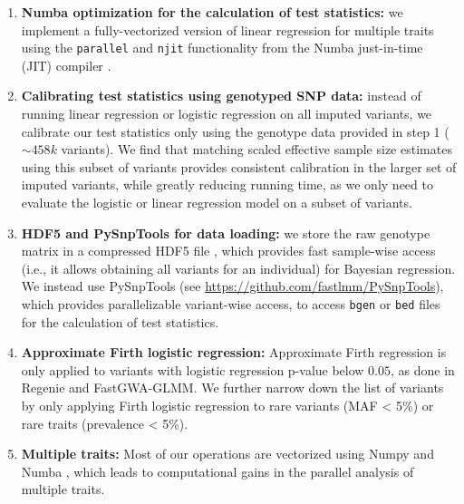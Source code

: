 \begin{enumerate}
    \item \textbf{Numba optimization for the calculation of test statistics:}
    we implement a fully-vectorized version of linear regression for multiple traits using the \texttt{parallel} and \texttt{njit} functionality from the Numba just-in-time (JIT) compiler \cite{lam2015numba}.
    \item \textbf{Calibrating test statistics using genotyped SNP data:}
    instead of running linear regression or logistic regression on all imputed variants, we calibrate our test statistics only using the genotype data provided in step 1 (${\sim}458k$ variants).
    We find that matching scaled effective sample size estimates using this subset of variants provides consistent calibration in the larger set of imputed variants, while greatly reducing running time, as we only need to evaluate the logistic or linear regression model on a subset of variants.
    \item \textbf{HDF5 and PySnpTools for data loading:}
    we store the raw genotype matrix in a compressed HDF5 file \cite{hdf5}, which provides fast sample-wise access (i.e., it allows obtaining all variants for an individual) for Bayesian regression.
    We instead use PySnpTools (see \url{https://github.com/fastlmm/PySnpTools}), which provides parallelizable variant-wise access, to access \texttt{bgen} or \texttt{bed} files for the calculation of test statistics. 
    \item \textbf{Approximate Firth logistic regression:} Approximate Firth regression is only applied to variants with logistic regression p-value below $0.05$, as done in Regenie and FastGWA-GLMM.
    We further narrow down the list of variants by only applying Firth logistic regression to rare variants (MAF < 5\%) or rare traits (prevalence < 5\%).
    \item \textbf{Multiple traits:} Most of our operations are vectorized using Numpy \cite{harris2020array} and Numba \cite{lam2015numba}, which leads to computational gains in the parallel analysis of multiple traits.
\end{enumerate}

